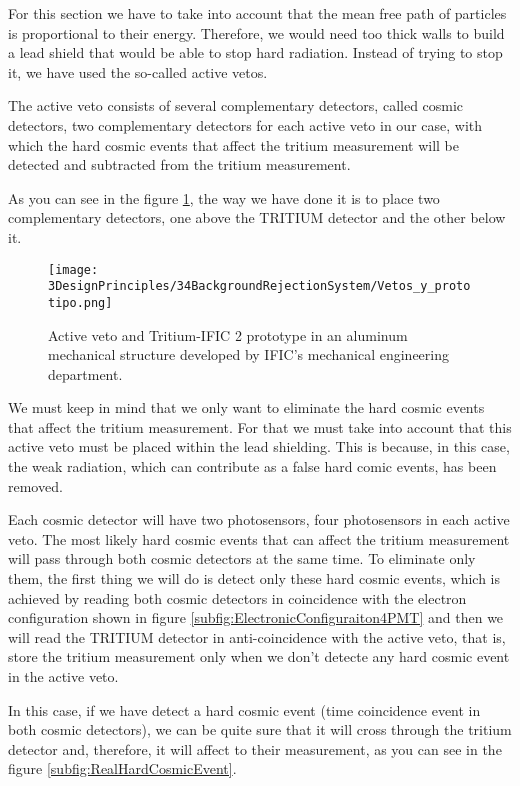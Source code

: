 For this section we have to take into account that the mean free path of particles is proportional to their energy. Therefore, we would need too thick walls to build a lead shield that would be able to stop hard radiation. Instead of trying to stop it, we have used the so-called active vetos.

The active veto consists of several complementary detectors, called cosmic detectors, two complementary detectors for each active veto in our case, with which the hard cosmic events that affect the tritium measurement will be detected and subtracted from the tritium measurement.

As you can see in the figure \ref{fig:VetoAndPrototype}, the way we have done it is to place two complementary detectors, one above the TRITIUM detector and the other below it. 

\begin{figure}[]
\centering
\texttt{[image: 3DesignPrinciples/34BackgroundRejectionSystem/Vetos\_y\_prototipo.png]}
\caption{Active veto and Tritium-IFIC 2 prototype in an aluminum mechanical structure developed by IFIC's mechanical engineering department.\label{fig:VetoAndPrototype}}
\end{figure}

We must keep in mind that we only want to eliminate the hard cosmic events that affect the tritium measurement. For that we must take into account that this active veto must be placed within the lead shielding. This is because, in this case, the weak radiation, which can contribute as a false hard comic events, has been removed.

Each cosmic detector will have two photosensors, four photosensors in each active veto. The most likely hard cosmic events that can affect the tritium measurement will pass through both cosmic detectors at the same time. To eliminate only them, the first thing we will do is detect only these hard cosmic events, which is achieved by reading both cosmic detectors in coincidence with the electron configuration shown in figure \ref{subfig:ElectronicConfiguraiton4PMT} and then we will read the TRITIUM detector in anti-coincidence with the active veto, that is, store the tritium measurement only when we don't detecte any hard cosmic event in the active veto. 

In this case, if we have detect a hard cosmic event (time coincidence event in both cosmic detectors), we can be quite sure that it will cross through the tritium detector and, therefore, it will affect to their measurement, as you can see in the figure \ref{subfig:RealHardCosmicEvent}.

